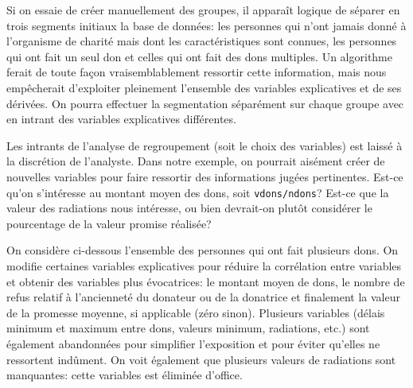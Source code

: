 \documentclass[
  11pt,
  letterpaper,
]{scrbook}
\theoremstyle{definition}
\theoremstyle{remark}
\begin{document}
Si on essaie de créer manuellement des groupes, il apparaît logique de
séparer en trois segments initiaux la base de données: les personnes qui
n'ont jamais donné à l'organisme de charité mais dont les
caractéristiques sont connues, les personnes qui ont fait un seul don et
celles qui ont fait des dons multiples. Un algorithme ferait de toute
façon vraisemblablement ressortir cette information, mais nous
empêcherait d'exploiter pleinement l'ensemble des variables explicatives
et de ses dérivées. On pourra effectuer la segmentation séparément sur
chaque groupe avec en intrant des variables explicatives différentes.

Les intrants de l'analyse de regroupement (soit le choix des variables)
est laissé à la discrétion de l'analyste. Dans notre exemple, on
pourrait aisément créer de nouvelles variables pour faire ressortir des
informations jugées pertinentes. Est-ce qu'on s'intéresse au montant
moyen des dons, soit \texttt{vdons/ndons}? Est-ce que la valeur des
radiations nous intéresse, ou bien devrait-on plutôt considérer le
pourcentage de la valeur promise réalisée?

On considère ci-dessous l'ensemble des personnes qui ont fait plusieurs
dons. On modifie certaines variables explicatives pour réduire la
corrélation entre variables et obtenir des variables plus évocatrices:
le montant moyen de dons, le nombre de refus relatif à l'ancienneté du
donateur ou de la donatrice et finalement la valeur de la promesse
moyenne, si applicable (zéro sinon). Plusieurs variables (délais minimum
et maximum entre dons, valeurs minimum, radiations, etc.) sont également
abandonnées pour simplifier l'exposition et pour éviter qu'elles ne
ressortent indûment. On voit également que plusieurs valeurs de
radiations sont manquantes: cette variables est éliminée d'office.
\end{document}
